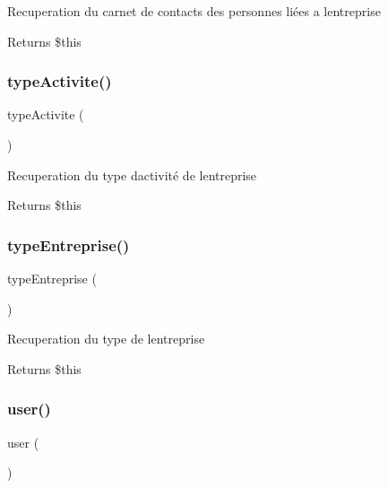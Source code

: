 Recuperation du carnet de contacts des personnes liées a l\textquotesingle{}entreprise \begin{DoxyReturn}{Returns}
\$this 
\end{DoxyReturn}
\mbox{\label{class_app_1_1_entreprise_afaa2ff98624087825021285dba843eda}} 
\subsubsection{\texorpdfstring{type\+Activite()}{typeActivite()}}
{\footnotesize\ttfamily type\+Activite (\begin{DoxyParamCaption}{ }\end{DoxyParamCaption})}

Recuperation du type d\textquotesingle{}activité de l\textquotesingle{}entreprise \begin{DoxyReturn}{Returns}
\$this 
\end{DoxyReturn}
\mbox{\label{class_app_1_1_entreprise_af0a763894489b33621f83aab2e8b5f6c}} 
\subsubsection{\texorpdfstring{type\+Entreprise()}{typeEntreprise()}}
{\footnotesize\ttfamily type\+Entreprise (\begin{DoxyParamCaption}{ }\end{DoxyParamCaption})}

Recuperation du type de l\textquotesingle{}entreprise \begin{DoxyReturn}{Returns}
\$this 
\end{DoxyReturn}
\mbox{\label{class_app_1_1_entreprise_ae8a275690ff1b618e1947378b0ed73ae}} 
\subsubsection{\texorpdfstring{user()}{user()}}
{\footnotesize\ttfamily user (\begin{DoxyParamCaption}{ }\end{DoxyParamCaption})}

